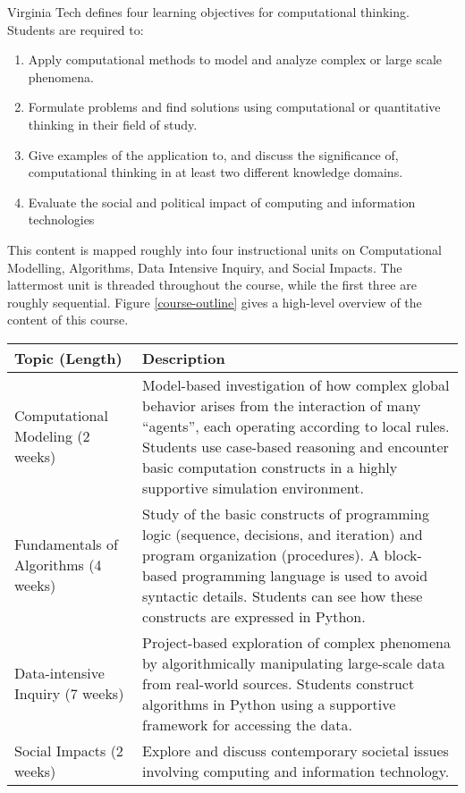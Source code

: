 Virginia Tech defines four learning objectives for computational thinking. Students are required to:
\begin{enumerate}
	\item Apply computational methods to model and analyze complex or large scale phenomena.
	\item Formulate problems and find solutions using computational or quantitative thinking in their field of study.
	\item Give examples of the application to, and discuss the significance of, computational thinking in at least two different knowledge domains. 
	\item Evaluate the social and political impact of computing and information technologies 
\end{enumerate}

This content is mapped roughly into four instructional units on Computational Modelling, Algorithms, Data Intensive Inquiry, and Social Impacts. The lattermost unit is threaded throughout the course, while the first three are roughly sequential. Figure \ref{course-outline} gives a high-level overview of the content of this course.

\begin{figure*}
\begin{tabularx}{\textwidth}{ |l|X| }
\hline
Topic (Length) &	Description \\\hline
Computational Modeling \newline\newline
 (2 weeks) & Model-based investigation of how complex global behavior arises from the interaction of many “agents”, each operating according to local rules. Students use case-based reasoning and encounter basic computation constructs in a highly supportive simulation environment. \\\hline
Fundamentals of Algorithms \newline (4 weeks) & Study of the basic constructs of programming logic (sequence, decisions, and iteration) and program organization (procedures). A block-based programming language is used to avoid syntactic details. Students can see how these constructs are expressed in Python. \\\hline
Data-intensive Inquiry \newline (7 weeks) & Project-based exploration of complex phenomena by algorithmically manipulating large-scale data from real-world sources. Students construct algorithms in Python using a supportive framework for accessing the data. \\\hline
Social Impacts \newline (2 weeks) & Explore and discuss contemporary societal issues involving computing and information technology. \\\hline
\end{tabularx}
\caption{High-Level Course Overview}
\label{course-outline}
\end{figure*}


